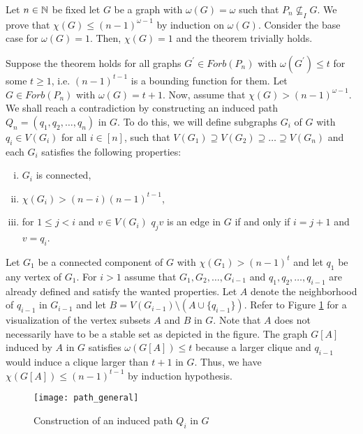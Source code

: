 \begin{prf}
Let $n\in\mathbb{N}$ be fixed let $G$ be a graph with $\omega (G)=\omega$ such that $P_n\nsubseteq_I G$. We prove that $\chi (G)\leq (n-1)^{\omega -1}$ by induction on $\omega (G)$. Consider the base case for $\omega (G) =1$. Then, $\chi (G) = 1$ and the theorem trivially holds.

Suppose the theorem holds for all graphs $G^\prime\in\textit{Forb}(P_n)$ with $\omega (G^\prime ) \leq t$ for some $t\geq 1$, i.e. $(n-1)^{t-1}$ is a bounding function for them. Let $G\in\textit{Forb}(P_n)$ with $\omega (G) = t + 1$. Now, assume that $\chi (G) > (n-1)^{\omega - 1}$. We shall reach a contradiction by constructing an induced path $Q_n=(q_1,q_2,\dots ,q_n)$ in $G$. To do this, we will define subgraphs $G_i$ of $G$ with $q_i\in V(G_i)$ for all $i\in [n]$, such that $V(G_1)\supseteq V(G_2)\supseteq \dots\supseteq V(G_n)$ and each $G_i$ satisfies the following properties:
\begin{enumerate}[(i)]
\item $G_i$ is connected,
\item $\chi (G_i) > (n-i)(n-1)^{t-1}$,
\item for $1\leq j<i$ and $v\in V(G_i)$ $q_jv$ is an edge in $G$ if and only if $i=j+1$ and $v = q_i$.
\end{enumerate}
Let $G_1$ be a connected component of $G$ with $\chi (G_1) >(n-1)^t$ and let $q_1$ be any vertex of $G_1$. For $i>1$ assume that $G_1,G_2,\dots , G_{i-1}$ and $q_1,q_2,\dots , q_{i-1}$ are already defined and satisfy the wanted properties. Let $A$ denote the neighborhood of $q_{i-1}$ in $G_{i-1}$ and let $B=V(G_{i-1})\setminus (A\cup\{q_{i-1}\})$. Refer to Figure \ref{f1cr} for a visualization of the vertex subsets $A$ and $B$ in $G$. Note that $A$ does not necessarily have to be a stable set as depicted in the figure. The graph $G[A]$ induced by $A$ in $G$ satisfies $\omega (G[A])\leq t$ because a larger clique and $q_{i-1}$ would induce a clique larger than $t+1$ in $G$. Thus, we have $\chi (G[A])\leq (n-1)^{t-1}$ by induction hypothesis.

\begin{figure}[ht]
\begin{center}
\texttt{[image: path\_general]}
\end{center}
\caption{Construction of an induced path $Q_i$ in $G$}
\label{f1cr}
\end{figure}



\end{prf}
